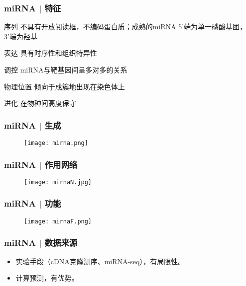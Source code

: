 \begin{frame}
  \frametitle{miRNA | 特征}
  \begin{block}{序列}
    不具有开放阅读框，不编码蛋白质；成熟的miRNA 5'端为单一磷酸基团，3'端为羟基
  \end{block}
  \pause
  \begin{block}{表达}
    具有时序性和组织特异性
  \end{block}
  \pause
  \begin{block}{调控}
    miRNA与靶基因间呈多对多的关系
  \end{block}
  \pause
  \begin{block}{物理位置}
    倾向于成簇地出现在染色体上
  \end{block}
  \pause
  \begin{block}{进化}
    在物种间高度保守
  \end{block}
\end{frame}

\begin{frame}
  \frametitle{miRNA | 生成}
  \begin{figure}
    \centering
    \texttt{[image: mirna.png]}
  \end{figure}
\end{frame}

\begin{frame}
  \frametitle{miRNA | 作用网络}
  \begin{figure}
    \centering
    \texttt{[image: mirnaN.jpg]}
  \end{figure}
\end{frame}

\begin{frame}
  \frametitle{miRNA | 功能}
  \begin{figure}
    \centering
    \texttt{[image: mirnaF.png]}
  \end{figure}
\end{frame}

\begin{frame}
  \frametitle{miRNA | 数据来源}
  \begin{itemize}
    \item 实验手段（cDNA克隆测序、miRNA-seq），有局限性。
    \item 计算预测，有优势。
  \end{itemize}
\end{frame}

